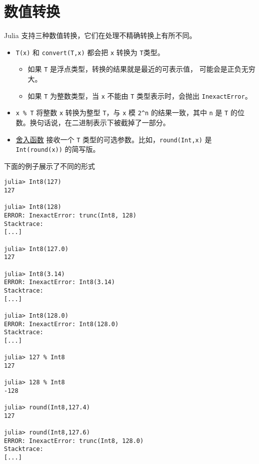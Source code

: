 \hypertarget{1678218620254251806}{}


\section{数值转换}



Julia 支持三种数值转换，它们在处理不精确转换上有所不同。



\begin{itemize}
\item \texttt{T(x)} 和 \texttt{convert(T,x)} 都会把 \texttt{x} 转换为 \texttt{T}类型。

\begin{itemize}
\item 如果 \texttt{T} 是浮点类型，转换的结果就是最近的可表示值， 可能会是正负无穷大。


\item 如果 \texttt{T} 为整数类型，当 \texttt{x} 不能由 \texttt{T} 类型表示时，会抛出 \texttt{InexactError}。

\end{itemize}

\item \texttt{x \% T} 将整数 \texttt{x} 转换为整型 \texttt{T}，与 \texttt{x} 模 \texttt{2{\textasciicircum}n} 的结果一致，其中 \texttt{n} 是 \texttt{T} 的位数。换句话说，在二进制表示下被截掉了一部分。


\item \hyperlink{9997236062216946610}{舍入函数} 接收一个 \texttt{T} 类型的可选参数。比如，\texttt{round(Int,x)} 是 \texttt{Int(round(x))} 的简写版。

\end{itemize}


下面的例子展示了不同的形式




\begin{verbatim}
julia> Int8(127)
127

julia> Int8(128)
ERROR: InexactError: trunc(Int8, 128)
Stacktrace:
[...]

julia> Int8(127.0)
127

julia> Int8(3.14)
ERROR: InexactError: Int8(3.14)
Stacktrace:
[...]

julia> Int8(128.0)
ERROR: InexactError: Int8(128.0)
Stacktrace:
[...]

julia> 127 % Int8
127

julia> 128 % Int8
-128

julia> round(Int8,127.4)
127

julia> round(Int8,127.6)
ERROR: InexactError: trunc(Int8, 128.0)
Stacktrace:
[...]
\end{verbatim}



